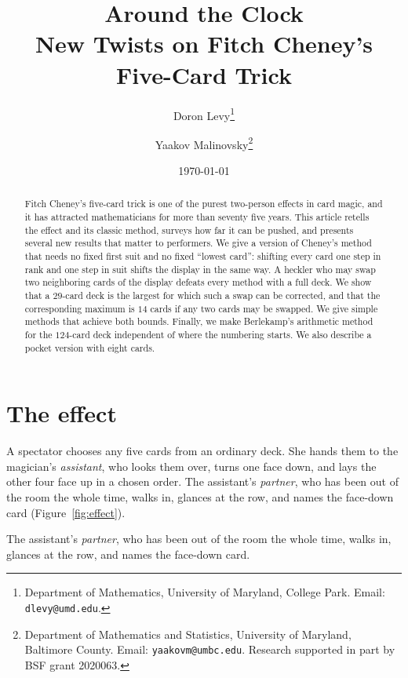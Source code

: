 \documentclass[11pt]{article}
\title{\LARGE Around the Clock\\[2mm]
\large New Twists on Fitch Cheney's Five-Card Trick}
\author{%
Doron Levy\thanks{%
Department of Mathematics, University of Maryland, College Park.
Email: \texttt{dlevy@umd.edu}.}
\and
Yaakov Malinovsky\thanks{%
Department of Mathematics and Statistics,
University of Maryland, Baltimore County.
Email: \texttt{yaakovm@umbc.edu}.
Research supported in part by BSF grant 2020063.}
}
\date{\today}
\begin{document}
\maketitle

\begin{abstract}
\noindent
Fitch Cheney's five-card trick is one of the purest two-person effects
in card magic, and it has attracted mathematicians for more than
seventy five years. This article retells the effect and its classic
method, surveys how far it can be pushed, and presents several new
results that matter to performers. We give a version of Cheney's
method that needs no fixed first suit and no fixed ``lowest card'':
shifting every card one step in rank and one step in suit shifts the display in the same way.
A heckler who may swap two neighboring cards of the display defeats every method with a full deck. 
We show that a $29$-card deck is the largest for which such a swap can be corrected, and that the corresponding maximum is $14$ cards if any two cards may be swapped. We give simple methods that achieve both bounds.
Finally, we make Berlekamp's arithmetic method for the $124$-card deck independent of where the numbering starts. We also describe a pocket version with eight cards.
\end{abstract}


\section{The effect}

A spectator chooses any five cards from an ordinary deck.
She hands them to the magician's \emph{assistant}, who looks them over, turns one face down, and lays the other four face up in a chosen order.
The assistant's \emph{partner}, who has been out of the room the whole time, walks in, glances at the row, and names the face-down card (Figure~\ref{fig:effect}).

The assistant's \emph{partner}, who has been out of the room the whole time, walks in, glances at the row, and names the face-down card.
\end{document}
